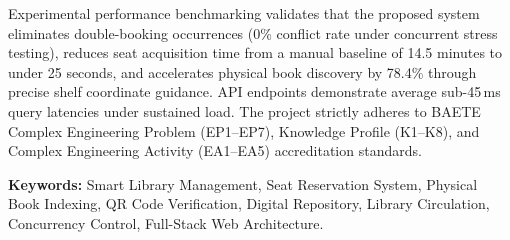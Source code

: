 Experimental performance benchmarking validates that the proposed system eliminates double-booking occurrences (0\% conflict rate under concurrent stress testing), reduces seat acquisition time from a manual baseline of 14.5 minutes to under 25 seconds, and accelerates physical book discovery by 78.4\% through precise shelf coordinate guidance. API endpoints demonstrate average sub-45\,ms query latencies under sustained load. The project strictly adheres to BAETE Complex Engineering Problem (EP1--EP7), Knowledge Profile (K1--K8), and Complex Engineering Activity (EA1--EA5) accreditation standards.

\vspace{0.5cm}
\noindent\textbf{Keywords:} Smart Library Management, Seat Reservation System, Physical Book Indexing, QR Code Verification, Digital Repository, Library Circulation, Concurrency Control, Full-Stack Web Architecture.

\cleardoublepage
\tableofcontents

\cleardoublepage
\listoffigures

\cleardoublepage
\listoftables

